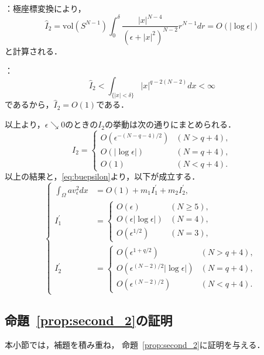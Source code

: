 ：極座標変換により，
\[
 \hat{I}_2 = \mathrm{vol}(S^{N-1}) \int_0^{\delta} \frac{ \lvert x
 \rvert^{N-4}}{(\epsilon + \lvert x \rvert^2)^{N-2}} r^{N-1} dr =
 O(\lvert \log \epsilon \rvert)
\]
と計算される．

：
\[
 \hat{I}_2 < \int_{ \{ \lvert x \rvert < \delta \}} \lvert x \rvert^{q -
 2(N-2)} dx < \infty
\]
であるから，$\hat{I}_2 = O(1)$である．

以上より，$\epsilon \searrow 0$のときの$I_2$の挙動は次の通りにまとめられる．
\[
 I_2 = \begin{cases}
        O(\epsilon^{-(N-q-4)/2}) & (N > q + 4),\\
        O(\lvert \log \epsilon \rvert) & (N = q + 4), \\ 
        O(1) & (N < q + 4).
       \end{cases}
\]
以上の結果と，\eqref{eq:buepsilon}より，以下が成立する．
\begin{equation}
 \left\{ 
 \begin{aligned}
  \int_\Omega a v_\epsilon^2 dx &= O(1) + m_1 I_1^\prime + m_2
  I_2^\prime, \\
  I_1^\prime &= \begin{cases}
                 O(\epsilon) & (N \geq 5), \\
                 O(\epsilon \lvert \log \epsilon \rvert) & (N = 4), \\
                 O(\epsilon^{1/2}) & (N = 3),
                \end{cases} \\
  I_2^\prime &= \begin{cases}
                 O(\epsilon^{1 + q/2 }) & (N > q + 4), \\
                 O(\epsilon^{(N-2)/2} \lvert \log \epsilon \rvert) & (N =
                 q + 4), \\
                 O(\epsilon^{(N-2)/2}) & (N < q + 4).
                \end{cases}
 \end{aligned} \right. \label{eq:av_epsilon}
\end{equation}

\subsection{命題~\ref{prop:second_2}の証明}

本小節では，補題を積み重ね，
命題~\ref{prop:second_2}に証明を与える．

